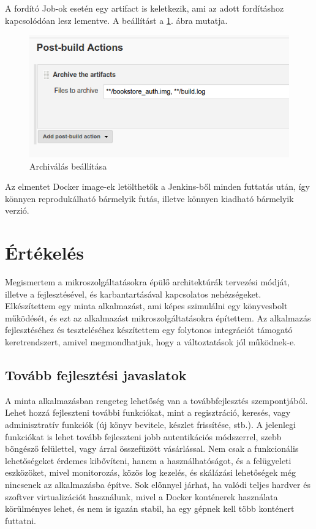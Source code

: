 \documentclass[11pt,magyar,a4paper,twoside,]{report}
\let\Oldincludegraphics\includegraphics
\renewcommand{\includegraphics}[1]{
\begin{adjustbox}{max size={\textwidth}{\textheight}}
    \Oldincludegraphics[scale=0.6]{#1}%
\end{adjustbox}
}
\begin{document}
A fordító Job-ok esetén egy artifact is keletkezik, ami az adott
fordításhoz kapcsolódóan lesz lementve. A beállítást a \ref{archive}.
ábra mutatja.

\begin{figure}[H]
\centering
\includegraphics{img/archive.png}
\caption{Archiválás beállítása\label{archive}}
\end{figure}

Az elmentet Docker image-ek letölthetők a Jenkins-ből minden futtatás
után, így könnyen reprodukálható bármelyik futás, illetve könnyen
kiadható bármelyik verzió.

\chapter{Értékelés}\label{uxe9rtuxe9keluxe9s}

Megismertem a mikroszolgáltatásokra épülő architektúrák tervezési
módját, illetve a fejlesztésével, és karbantartásával kapcsolatos
nehézségeket. Elkészítettem egy minta alkalmazást, ami képes szimulálni
egy könyvesbolt működését, és ezt az alkalmazást mikroszolgáltatásokra
építettem. Az alkalmazás fejlesztéséhez és teszteléséhez készítettem egy
folytonos integrációt támogató keretrendszert, amivel megmondhatjuk,
hogy a változtatások jól működnek-e.

\section{Tovább fejlesztési
javaslatok}\label{tovuxe1bb-fejlesztuxe9si-javaslatok}

A minta alkalmazásban rengeteg lehetőség van a továbbfejlesztés
szempontjából. Lehet hozzá fejleszteni további funkciókat, mint a
regisztráció, keresés, vagy adminisztratív funkciók (új könyv bevitele,
készlet frissítése, stb.). A jelenlegi funkciókat is lehet tovább
fejleszteni jobb autentikációs módszerrel, szebb böngésző felülettel,
vagy árral összefűzött vásárlással. Nem csak a funkcionális
lehetőségeket érdemes kibővíteni, hanem a használhatóságot, és a
felügyeleti eszközöket, mivel monitorozás, közös log kezelés, és
skálázási lehetőségek még nincsenek az alkalmazásba építve. Sok előnnyel
járhat, ha valódi teljes hardver és szoftver virtualizációt használunk,
mivel a Docker konténerek használata körülményes lehet, és nem is igazán
stabil, ha egy gépnek kell több konténert futtatni.
\end{document}
